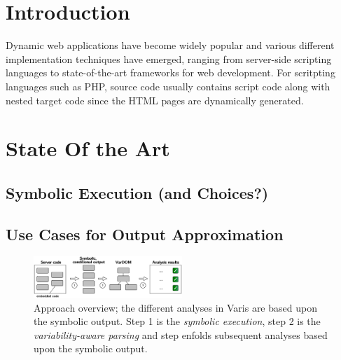 \documentclass{sig-alternate-05-2015}
\begin{document}



%
%
\printccsdesc



\section{Introduction}
Dynamic web applications have become widely popular and various different
implementation techniques have emerged, ranging from server-side scripting
languages to state-of-the-art frameworks for web development. For scritpting
languages such as PHP, source code usually contains script code along with nested
target code since the HTML pages are dynamically generated.


\section{State Of the Art}
\subsection{Symbolic Execution (and Choices?)}
\subsection{Use Cases for Output Approximation}

\begin{figure}
	
	\centering
	\includegraphics[width=0.5\textwidth]{images-paper/approach}
	\caption{Approach overview; the different analyses in Varis are based upon the
	symbolic output. Step 1 is the \emph{symbolic execution}, step 2 is the
	\emph{variability-aware parsing} and step enfolds subsequent analyses based
	upon the symbolic output.}
	\label{approach}
\end{figure}
\end{document}
